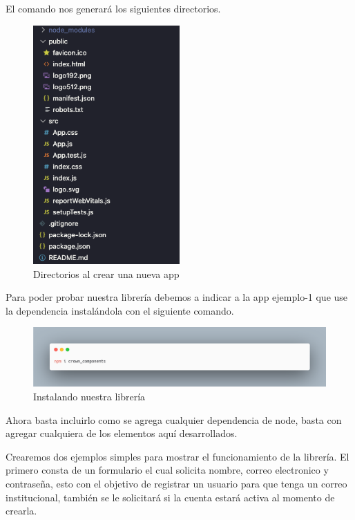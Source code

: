 El comando nos generará los siguientes directorios.
\newline
\begin{figure}[H]
    \includegraphics[width=0.5\textwidth]{./Imagenes/9.3.png}
   \centering 
    \caption[Directorios al crear una nueva app]{Directorios al crear una nueva app}
    \end{figure}
\newline

Para poder probar nuestra librería debemos a indicar a la app ejemplo-1 que use la dependencia instalándola con el siguiente comando.\newline
\newline
\begin{figure}[H]
    \includegraphics[width=1\textwidth]{./Imagenes/9.4}
   \centering 
    \caption[Instalando nuestra librería]{Instalando nuestra librería}
    \end{figure}
\newline

Ahora basta incluirlo como se agrega cualquier dependencia de node, basta con agregar cualquiera de los elementos aquí desarrollados. 

Crearemos dos ejemplos simples para mostrar el funcionamiento de la librería.
El primero consta de un formulario el cual solicita nombre, correo electronico y contraseña, esto con el objetivo de registrar un usuario para que tenga un correo institucional, también se le solicitará si la cuenta estará activa al momento de crearla.

